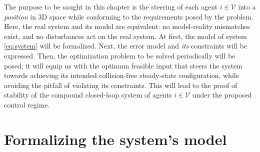 The purpose to be saught in this chapter is the steering of each agent
$i \in \mathcal{V}$ into a \textit{position} in 3D space while conforming to
the requirements posed by the problem. Here, the real system and its model are
equivalent: no model-reality mismatches exist, and no disturbances act on the
real system. At first, the model of system \eqref{eq:system} will be formalized.
Next, the error model and \textit{its} constraints will be expressed. Then, the
optimization problem to be solved periodically will be posed;
it will equip us with the optimum feasible input that steers the system towards
achieving its intended collision-free steady-state configuration, while avoiding
the pitfall of violating its constraints. This will lead to the proof of
stability of the compound closed-loop system of agents $i \in \mathcal{V}$
under the proposed control regime.


\section{Formalizing the system's model}

